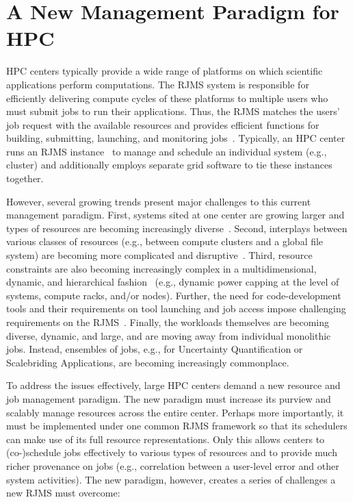 \section{A New Management Paradigm for HPC}
\label{label:paradigm}
HPC centers typically provide a wide range of 
platforms on which scientific applications perform
computations.
The RJMS system is responsible for efficiently delivering 
compute cycles of these platforms
to multiple users who must submit jobs to run their applications. 
Thus, the RJMS matches the users' job request with the available 
resources and provides efficient functions 
for building, submitting, launching, 
and monitoring jobs~\cite{GeorgiouThesis}. 
Typically, an HPC center runs an RJMS instance~\cite{Jette02slurm} 
to manage and schedule an individual system (e.g., cluster) and 
additionally employs separate grid software to tie 
these instances together. 

However, several growing trends present major challenges 
to this current management paradigm. 
First, systems sited at one center are growing larger 
and types of resources are becoming increasingly diverse~\cite{GeorgiouThesis}. 
Second, interplays between 
various classes of resources
(e.g., between compute clusters and a global file system)
are becoming more complicated and disruptive~\cite{SCR,SPINDLE}. 
Third, resource constraints are also becoming increasingly
complex in a multidimensional, dynamic, and hierarchical fashion~\cite{power-overprovision}
(e.g., dynamic power capping at the level of systems, compute racks, and/or nodes).
Further, the need for code-development tools and their requirements on tool launching and job access
impose challenging requirements on the RJMS~\cite{STAT,SPINDLE,PRUNER,SCR,launchmon}.
Finally, the workloads themselves are becoming 
diverse, dynamic, and large, and are moving away from individual monolithic jobs. Instead,
ensembles of jobs, e.g., for Uncertainty Quantification 
or Scalebriding Applications, are becoming increasingly commonplace.

To address the issues effectively,
large HPC centers demand a new resource and job management paradigm.
The new paradigm must increase its purview and 
scalably manage resources across the entire center.
Perhaps more importantly, it must be implemented under one common 
RJMS framework so that its schedulers can make use of
its full resource representations.
Only this allows centers to (co-)schedule jobs 
effectively to various types of resources and to
provide much richer provenance on jobs (e.g., correlation between
a user-level error and other system activities). 
The new paradigm, however,
creates a series of challenges a new RJMS must overcome:

